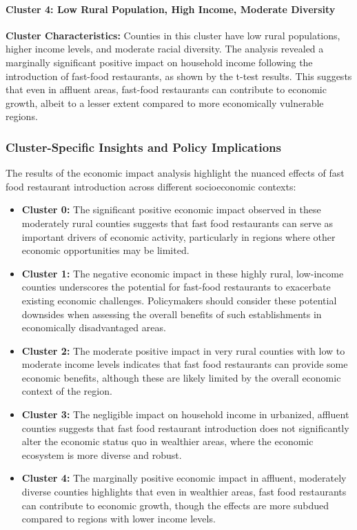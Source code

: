 \documentclass[letterpaper, 11pt]{report}
\begin{document}
\paragraph{Cluster 4: Low Rural Population, High Income, Moderate Diversity}
\textbf{Cluster Characteristics:} Counties in this cluster have low rural populations, higher income levels, and moderate racial diversity. The analysis revealed a marginally significant positive impact on household income following the introduction of fast-food restaurants, as shown by the t-test results. This suggests that even in affluent areas, fast-food restaurants can contribute to economic growth, albeit to a lesser extent compared to more economically vulnerable regions.

\subsubsection{Cluster-Specific Insights and Policy Implications}
The results of the economic impact analysis highlight the nuanced effects of fast food restaurant introduction across different socioeconomic contexts:

\begin{itemize}
    \item \textbf{Cluster 0:} The significant positive economic impact observed in these moderately rural counties suggests that fast food restaurants can serve as important drivers of economic activity, particularly in regions where other economic opportunities may be limited.
    
    \item \textbf{Cluster 1:} The negative economic impact in these highly rural, low-income counties underscores the potential for fast-food restaurants to exacerbate existing economic challenges. Policymakers should consider these potential downsides when assessing the overall benefits of such establishments in economically disadvantaged areas.
    
    \item \textbf{Cluster 2:} The moderate positive impact in very rural counties with low to moderate income levels indicates that fast food restaurants can provide some economic benefits, although these are likely limited by the overall economic context of the region.
    
    \item \textbf{Cluster 3:} The negligible impact on household income in urbanized, affluent counties suggests that fast food restaurant introduction does not significantly alter the economic status quo in wealthier areas, where the economic ecosystem is more diverse and robust.
    
    \item \textbf{Cluster 4:} The marginally positive economic impact in affluent, moderately diverse counties highlights that even in wealthier areas, fast food restaurants can contribute to economic growth, though the effects are more subdued compared to regions with lower income levels.
\end{itemize}
\end{document}
